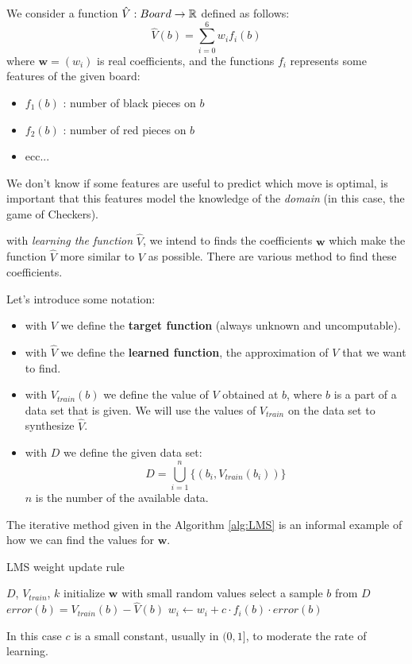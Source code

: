 \documentclass[10pt, letterpaper]{report}
\begin{document}
We consider a function $\hat V: Board\rightarrow{\mathbb R}$ defined as follows:\begin{equation}
	\hat V(b)=\sum_{i=0}^6w_if_i(b)
\end{equation}
where $\mathbf w = (w_i)$ is real coefficients, and the functions $f_i$ represents some features of the given board:\begin{itemize}
	\item $f_1(b)$ : number of black pieces on $b$
	\item $f_2(b)$ : number of red pieces on $b$
	\item ecc...
\end{itemize}
We don't know if some features are useful to predict which move is optimal, is important that this features model the knowledge of the \textit{domain} (in this case, the game of Checkers). \bigskip

with \textit{learning the function} $\hat V$, we intend to finds the coefficients $\mathbf w$ which make the function $\hat V$ more similar to $V$ as possible. There are various method to find these coefficients.\bigskip

Let's introduce some notation:\begin{itemize}
	\item with $V$ we  define the \textbf{target function} (always unknown and uncomputable).
	\item with $\hat V$ we  define the \textbf{learned function}, the approximation of $V$ that we want to find.
	\item with $V_{train}(b)$ we define the value of $V$ obtained at $b$, where $b$ is a part of a data set that is given. We will use the values of $V_{train}$ on the data set to synthesize $\hat V$.
	\item with $D$ we define the given data set:\begin{equation}
		      D=\bigcup_{i=1}^n\{(b_i,V_{train}(b_i))\}
	      \end{equation}
	      $n$ is the number of the available data.
\end{itemize}
The iterative method given in the Algorithm \ref{alg:LMS} is an informal example of how we can find the values for $\mathbf w$.
\begin{algorithm}
	\caption{LMS weight update rule}\label{alg:LMS}
	\begin{algorithmic}
		\Require $D$, $V_{train}$, $k$
		\State initialize $\mathbf w$ with small random values
		\State select a sample $b$ from $D$
		\State $error(b)=V_{train}(b)-\hat V(b)$
		\State $w_i\leftarrow w_i+c\cdot f_i(b)\cdot error(b)$
		\EndFor
		\EndFor
	\end{algorithmic}
\end{algorithm}
In this case $c$ is a small constant, usually in $(0,1]$, to moderate the rate of learning.\bigskip
\end{document}
